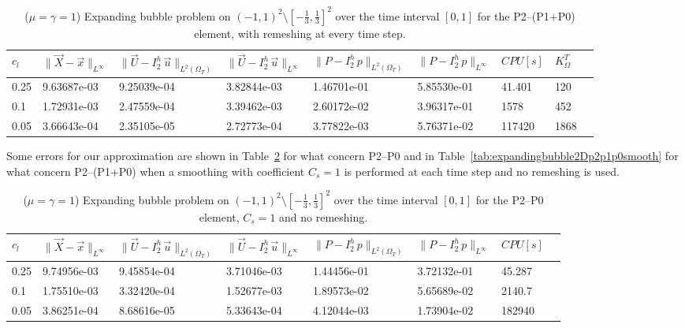 \documentclass[a4paper,12pt,onecolumn]{article}
\newcommand{\errorXx}{\|\vec{X} - \vec{x}\|_{L^\infty}}
\newcommand{\LerrorUu}[1]{\|\vec U - I^h_{#1}\,\vec u\|_{L^2(\Omega_T)}}
\newcommand{\errorUu}[1]{\|\vec U - I^h_{#1}\,\vec u\|_{L^\infty}}
\newcommand{\errorPp}[1]{\|P - I^h_{#1}\,p\|_{L^\infty}}
\newcommand{\LerrorPp}[1]{\|P - I^h_{#1}\,p\|_{L^2(\Omega_T)}}
\begin{document}
\begin{table}
 \center
 \hspace*{-2cm}
\begin{tabular}{lllllllll}
\hline
$c_l$ & $\errorXx$ & $\LerrorUu2$ & $\errorUu2$ & $\LerrorPp2$ & $\errorPp2$ & $CPU[s]$ & $K_\Omega^T$\\
\hline
0.25 & 9.63687e-03 & 9.25039e-04 & 3.82844e-03 & 1.46701e-01 & 5.85530e-01 & 41.401 & 120\\
0.1 & 1.72931e-03 & 2.47559e-04 & 3.39462e-03 & 2.60172e-02 & 3.96317e-01 & 1578 & 452\\
0.05 & 3.66643e-04 & 2.35105e-05 & 2.72773e-04 & 3.77822e-03 & 5.76371e-02 & 117420 & 1868\\%
\hline
\end{tabular}
\hspace*{-2cm}
\caption{($\mu=\gamma=1$) Expanding bubble problem on $(-1,1)^2\setminus[-\frac{1}{3},\frac{1}{3}]^2$ over the time interval $[0,1]$ for the P2--(P1+P0) element, with remeshing at every time step.}
\label{tab:expandingbubble2Dp2p1p0remesh}
\end{table}

Some errors for our approximation are shown in Table~\ref{tab:expandingbubble2Dp2p0smooth} for what concern P2--P0 and in Table~\ref{tab:expandingbubble2Dp2p1p0smooth} for what concern P2--(P1+P0) when a smoothing with coefficient $C_s=1$ is performed at each time step and no remeshing is used.

\begin{table}
 \center
 \hspace*{-2cm}
\begin{tabular}{llllllll}
\hline
$c_l$ & $\errorXx$ & $\LerrorUu2$ & $\errorUu2$ & $\LerrorPp2$ & $\errorPp2$ & $CPU[s]$\\
\hline
0.25 & 9.74956e-03 & 9.45854e-04 & 3.71046e-03 & 1.44456e-01 & 3.72132e-01 & 45.287\\
0.1 & 1.75510e-03 & 3.32420e-04 & 1.52677e-03 & 1.89573e-02 & 5.65689e-02 & 2140.7\\
0.05 & 3.86251e-04 & 8.68616e-05 & 5.33643e-04 & 4.12044e-03 & 1.73904e-02 & 182940\\%
\hline
\end{tabular}
\hspace*{-2cm}
\caption{($\mu=\gamma=1$) Expanding bubble problem on $(-1,1)^2\setminus[-\frac{1}{3},\frac{1}{3}]^2$ over the time interval $[0,1]$ for the P2--P0 element, $C_s=1$ and no remeshing.}
\label{tab:expandingbubble2Dp2p0smooth}
\end{table}
\end{document}
